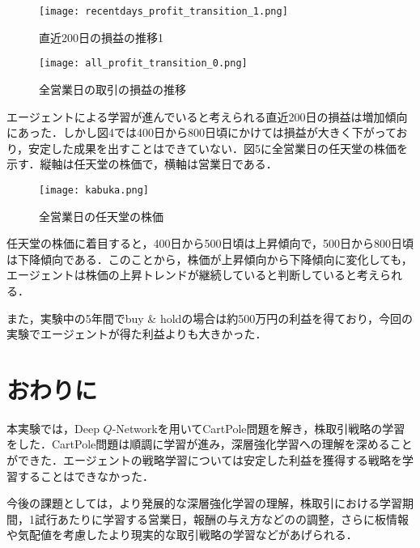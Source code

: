 \documentclass[twocolumn]{jarticle}
\begin{document}
        \begin{figure}
            \texttt{[image: recentdays\_profit\_transition\_1.png]}
            \caption{直近200日の損益の推移1}
        \end{figure}

        \begin{figure}
            \texttt{[image: all\_profit\_transition\_0.png]}
            \caption{全営業日の取引の損益の推移}
        \end{figure}

        エージェントによる学習が進んでいると考えられる直近200日の損益は増加傾向にあった．しかし図4では400日から800日頃にかけては損益が大きく下がっており，安定した成果を出すことはできていない．図5に全営業日の任天堂の株価を示す．縦軸は任天堂の株価で，横軸は営業日である．

        \begin{figure}
            \texttt{[image: kabuka.png]}
            \caption{全営業日の任天堂の株価}
        \end{figure}

        任天堂の株価に着目すると，400日から500日頃は上昇傾向で，500日から800日頃は下降傾向である．このことから，株価が上昇傾向から下降傾向に変化しても，エージェントは株価の上昇トレンドが継続していると判断していると考えられる．

        また，実験中の5年間でbuy \& holdの場合は約500万円の利益を得ており，今回の実験でエージェントが得た利益よりも大きかった．
        
\section{おわりに}
本実験では，Deep $Q$-Networkを用いてCartPole問題を解き，株取引戦略の学習をした．CartPole問題は順調に学習が進み，深層強化学習への理解を深めることができた．エージェントの戦略学習については安定した利益を獲得する戦略を学習することはできなかった．

今後の課題としては，より発展的な深層強化学習の理解，株取引における学習期間，1試行あたりに学習する営業日，報酬の与え方などのの調整，さらに板情報や気配値を考慮したより現実的な取引戦略の学習などがあげられる．




\end{document}
